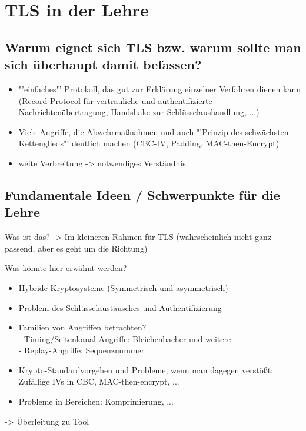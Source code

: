 
\chapter{TLS in der Lehre}

\section{Warum eignet sich TLS bzw. warum sollte man sich überhaupt damit befassen?}

\begin{mdframed}
\begin{itemize}
	\item "'einfaches"' Protokoll, das gut zur Erklärung einzelner Verfahren dienen kann (Record-Protocol für vertrauliche und authentifizierte Nachrichtenübertragung, Handshake zur Schlüsselaushandlung, ...)
	\item Viele Angriffe, die Abwehrmaßnahmen und auch "'Prinzip des schwächsten Kettenglieds"' deutlich machen (CBC-IV, Padding, MAC-then-Encrypt)
	\item weite Verbreitung -> notwendiges Verständnis
\end{itemize}
\end{mdframed}

\section{Fundamentale Ideen / Schwerpunkte für die Lehre}

\begin{mdframed}

Was ist das? -> Im kleineren Rahmen für TLS (wahrscheinlich nicht ganz passend, aber es geht um die Richtung)

Was könnte hier erwähnt werden?
\begin{itemize}
	\item Hybride Kryptosysteme (Symmetrisch und asymmetrisch)
	\item Problem des Schlüsselaustausches und Authentifizierung
	\item Familien von Angriffen betrachten?\\
	- Timing/Seitenkanal-Angriffe: Bleichenbacher und weitere\\
	- Replay-Angriffe: Sequenznummer
	\item Krypto-Standardvorgehen und Probleme, wenn man dagegen verstößt: Zufällige IVs in CBC, MAC-then-encrypt, ...
	\item Probleme in  Bereichen: Komprimierung, ...
\end{itemize}

-> Überleitung zu Tool

\end{mdframed}

